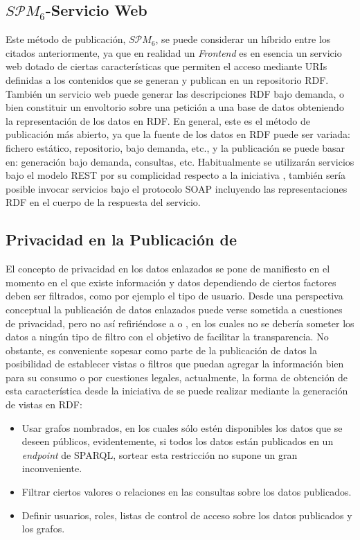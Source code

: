 \subsection{$S\mathcal{P}M_{6}$-Servicio Web}\label{servicio-web-produccion}
Este método de publicación, $S\mathcal{P}M_{6}$, se puede considerar un híbrido
entre los citados anteriormente, ya que en realidad un \linkeddata \textit{Frontend} es en esencia 
un servicio web dotado de ciertas características que permiten el acceso mediante URIs definidas a los contenidos
que se generan y publican en un repositorio \gls{RDF}. También un servicio web puede generar las descripciones
RDF bajo demanda, o bien constituir un envoltorio sobre una petición a una base de datos obteniendo
la representación de los datos en RDF. En general, este es el método de publicación más abierto, 
ya que la fuente de los datos en RDF puede ser variada: fichero estático, repositorio, bajo demanda, etc., 
y la publicación se puede basar en: generación bajo demanda, consultas, etc. Habitualmente se utilizarán
servicios bajo el modelo \gls{REST} por su complicidad respecto a la iniciativa \linkeddata, también sería posible invocar servicios 
bajo el protocolo \gls{SOAP} incluyendo las representaciones RDF en el cuerpo de la respuesta del servicio. 


\subsection{Privacidad en la Publicación de \linkeddata}
El concepto de privacidad en los datos enlazados se pone de manifiesto en el momento
en el que existe información y datos dependiendo de ciertos factores deben ser filtrados, como por ejemplo el tipo
de usuario. Desde una perspectiva conceptual la publicación de datos
enlazados puede verse sometida a cuestiones de privacidad, pero no así refiriéndose 
a \opendata o \lod, en los cuales no se debería someter los datos a ningún tipo de filtro
con el objetivo de facilitar la transparencia. No obstante, es conveniente sopesar 
como parte de la publicación de datos la posibilidad de establecer vistas
o filtros que puedan agregar la información bien para su consumo o por cuestiones
legales, actualmente, la forma de obtención de esta característica desde la iniciativa
de \linkeddata se puede realizar mediante la generación de vistas en \gls{RDF}:

\begin{itemize}
 \item Usar grafos nombrados, en los cuales sólo estén disponibles los datos que se deseen públicos, evidentemente,
si todos los datos están publicados en un \textit{endpoint} de \gls{SPARQL}, sortear esta restricción no supone un gran inconveniente.
\item Filtrar ciertos valores o relaciones en las consultas sobre los datos publicados.
\item Definir usuarios, roles, listas de control de acceso sobre los datos publicados y los grafos.
\end{itemize}

